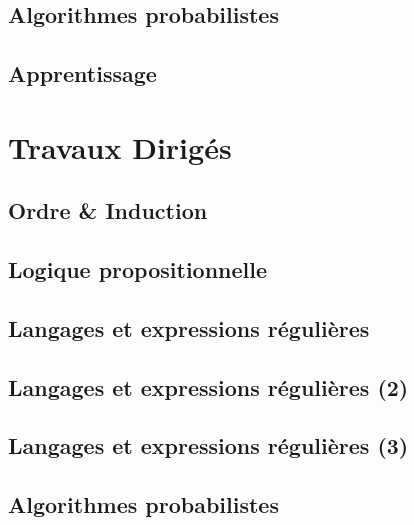 \documentclass[a4paper]{book}
\let\prefix\relax
\def\thechapter{
		\setbox\spacebox=\hbox{\relax$-$\ }\kern-\wd\spacebox
		\ifnum\value{chapter}<0%
			$-\text{\number-\value{chapter}}$%
		\else
			$\mathop{\phantom{-}}\text{\arabic{chapter}}$%
		\fi
	}
\def\thesection{\prefix\thechapter.\arabic{section}}
\newcommand{\chap}[2][0]{
	\setcounter{chapter}{#1 - 1}
	\chapter{#2}
	\renewcommand*\parttitle{#2}
}
\newcommand{\td}[2][1]{
	\setcounter{chapter}{#1 - 1}
	\chapter{#2}
	\renewcommand*\parttitle{#2}
}
\begin{document}
	{
		\chap[2]{Algorithmes probabilistes}
		\minitoc
		\renewcommand{\cwd}{../cours/chap02/}
		
		
		
		\clearpage
		\setcounter{section}{0}
		\renewcommand{\thesection}{\llap{Annexe }\thechapter.\Alph{section}}
		
	}

	{
		\chap[3]{Apprentissage}
		\minitoc
		\renewcommand{\cwd}{../cours/chap03/}
		
		
	}

	\part{Travaux Dirigés}
	\def\prefix{\textsc{td}}
	
	\renewcommand{\chaptername}{Travaux Dirigés}

	{
		\td[1]{Ordre \& Induction}
		\renewcommand{\cwd}{../td/td01/}
		
		
		
		
		
		
		
		
	}

	{
		\td[2]{Logique propositionnelle}
		\renewcommand{\cwd}{../td/td02/}
		
		
		
		
		
		
		
		
	}

	{
		\td[3]{Langages et expressions régulières}
		\renewcommand{\cwd}{../td/td03/}
		
		
		
		
		
		
		
		
		
		
		
		
		
	}

	{
		\td[4]{Langages et expressions régulières (2)}
		\renewcommand{\cwd}{../td/td04/}
		
		
		
		
		
	}

	{
		\td[5]{Langages et expressions régulières (3)}
		\renewcommand{\cwd}{../td/td05/}
		
		
		
		
	}

	{
		\td[6]{Algorithmes probabilistes}
		\renewcommand{\cwd}{../td/td06/}
		
		
		
	}
\end{document}
